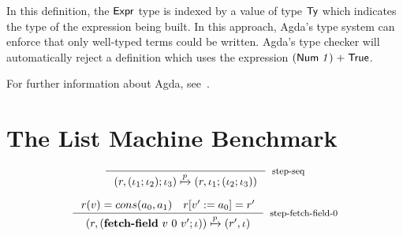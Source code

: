 \documentclass[sigconf]{acmart}
\theoremstyle{definition}
\newcommand{\D}[1]{\blue{\mathsf{#1}}}
\newcommand{\Con}[1]{\red{\mathsf{#1}}}
\newcommand{\F}[1]{\green{\mathsf{#1}}}
\newcommand{\V}[1]{\purple{\mathit{#1}}}
\begin{document}
In this definition, the \ensuremath{\D{Expr}} type is indexed by a value of type \ensuremath{\D{Ty}} which
indicates the type of the expression being built. In this approach, Agda's
type system can enforce that only well-typed terms could be written.
Agda's type checker will automatically reject a definition which uses the expression \ensuremath{(\Con{Num}\;\V{1})\;\F{+}\;\Con{True}}.

%


For further information about Agda, see~\cite{Norell2009,Stump16}.

\section{The List Machine Benchmark}\label{sec:list}

\begin{equation}
\inference{}
          {(r, (\iota_1;\iota_2);\iota_3) \xmapsto{p} (r, \iota_1;(\iota_2;\iota_3))}[step-seq]
\end{equation}

\begin{equation}
\inference{r(v) = cons(a_0,a_1)~~~r[v':=a_0]=r'}
          {(r, (\textbf{fetch-field}~v~0~v';\iota)) \xmapsto{p} (r', \iota)}[step-fetch-field-0]
\end{equation}
\end{document}
